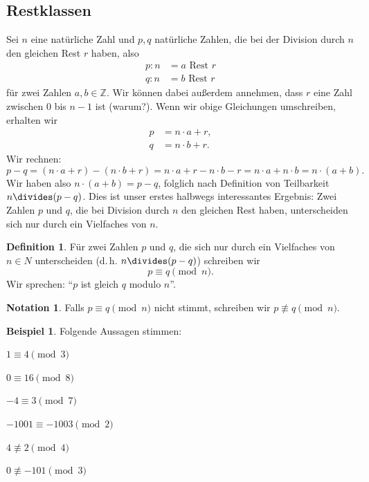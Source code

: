 \documentclass[a4paper,ngerman,12pt]{scrartcl}
\newcommand{\Z}{\mathbb{Z}}
\theoremstyle{definition}
\newtheorem{defn}{Definition}
\newtheorem*{nota}{Notation}
\newtheorem*{bsp}{Beispiel}
\begin{document}
\subsection{Restklassen}

Sei $n$ eine natürliche Zahl und $p, q$ natürliche Zahlen, die bei der Division durch $n$ den gleichen Rest $r$ haben, also
\begin{align*}
  p : n &= a \text{ Rest } r \\
  q : n &= b \text{ Rest } r
\end{align*}
für zwei Zahlen $a, b \in \Z$. Wir können dabei außerdem annehmen, dass $r$ eine Zahl zwischen $0$ bis $n - 1$ ist (warum?). Wenn wir obige Gleichungen umschreiben, erhalten wir
\begin{align*}
  p &= n \cdot a + r, \\
  q &= n \cdot b + r.
\end{align*}
Wir rechnen:
\[ p - q = (n \cdot a + r) - (n \cdot b + r) = n \cdot a + r - n \cdot b - r = n \cdot a + n \cdot b = n \cdot (a + b). \]
Wir haben also $n \cdot (a+b) = p - q$, folglich nach Definition von Teilbarkeit $n \divides (p - q)$. Dies ist unser erstes halbwegs interessantes Ergebnis: Zwei Zahlen $p$ und $q$, die bei Division durch $n$ den gleichen Rest haben, unterscheiden sich nur durch ein Vielfaches von $n$.

\begin{defn}
  Für zwei Zahlen $p$ und $q$, die sich nur durch ein Vielfaches von $n \in N$ unterscheiden (d.\,h. $n \divides (p-q)$) schreiben wir
  \[ p \equiv q \pmod{n}. \]
  Wir sprechen: "`$p$ ist gleich $q$ modulo $n$"'.
\end{defn}

\begin{nota}
  Falls $p \equiv q \pmod{n}$ nicht stimmt, schreiben wir $p \not\equiv q \pmod{n}$.
\end{nota}

\begin{bsp}
  Folgende Aussagen stimmen:
  \begin{itemize}
    \begin{multicols}{3}
      \item $1 \equiv 4 \pmod{3}$
      \item $0 \equiv 16 \pmod{8}$
      \item $-4 \equiv 3 \pmod{7}$
      \item $-1001 \equiv -1003 \pmod{2}$
      \item $4 \not\equiv 2 \pmod{4}$
      \item $0 \not\equiv -101 \pmod{3}$
    \end{multicols}
  \end{itemize}
\end{bsp}
\end{document}

